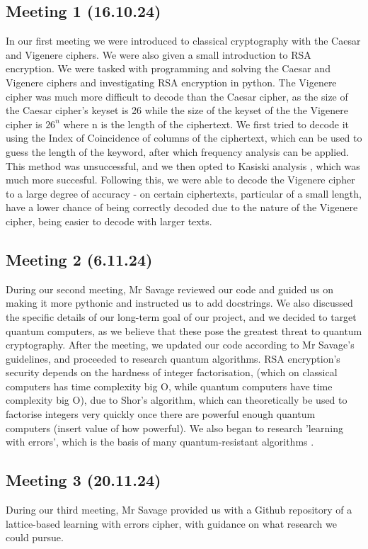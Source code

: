 \documentclass{article}
\begin{document}
\subsection{Meeting 1 (16.10.24)}
In our first meeting we were introduced to classical cryptography with the
Caesar and Vigenere ciphers. We were also given a small introduction to RSA
encryption. We were tasked with programming and solving the Caesar and Vigenere
ciphers and investigating RSA encryption in python. The Vigenere cipher was
much more difficult to decode than the Caesar cipher, as the size of the Caesar
cipher's keyset is 26 while the size of the keyset of the the Vigenere cipher
is $ 26^n $ where n is the length of the ciphertext. We first tried to decode
it using the Index of Coincidence \cite{ioc} of columns of the ciphertext,
which can be used to guess the length of the keyword, after which frequency
analysis can be applied. This method was unsuccessful, and we then opted to
Kasiski analysis \cite{kasiski}, which was much more succesful. Following this,
we were able to decode the Vigenere cipher to a large degree of accuracy - on
certain ciphertexts, particular of a small length, have a lower chance of being
correctly decoded due to the nature of the Vigenere cipher, being easier to
decode with larger texts.

\subsection{Meeting 2 (6.11.24)}
During our second meeting, Mr Savage reviewed our code and guided us on making
it more pythonic and instructed us to add docstrings. We also discussed the
specific details of our long-term goal of our project, and we decided to target
quantum computers, as we believe that these pose the greatest threat to quantum
cryptography. After the meeting, we updated our code according to Mr Savage's
guidelines, and proceeded to research quantum algorithms. RSA encryption's
security depends on the hardness of integer factorisation, (which on classical
computers has time complexity big O, while quantum computers have time
complexity big O), due to Shor's algorithm, which can theoretically be used to
factorise integers very quickly once there are powerful enough quantum
computers (insert value of how powerful). We also began to research 'learning
with errors', which is the basis of many quantum-resistant algorithms
\cite{LWE}.

\subsection{Meeting 3 (20.11.24)}
During our third meeting, Mr Savage provided us with a Github repository of a
lattice-based learning with errors cipher, with guidance on what research we
could pursue.



\end{document}
